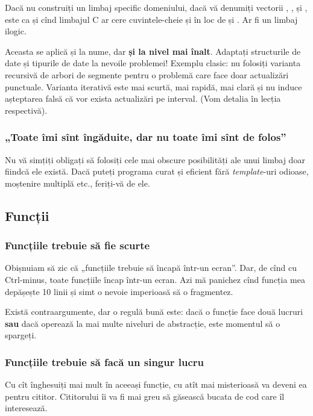 \documentclass[../main.tex]{subfiles}
\begin{document}
Dacă nu construiți un limbaj specific domeniului, dacă vă denumiți vectorii , ,  și , este ca și cînd limbajul C ar cere cuvintele-cheie  și  în loc de  și . Ar fi un limbaj ilogic.

Aceasta se aplică și la nume, dar \textbf{și la nivel mai înalt}. Adaptați structurile de date și tipurile de date la nevoile problemei! Exemplu clasic: nu folosiți varianta recursivă de arbori de segmente pentru o problemă care face doar actualizări punctuale. Varianta iterativă este mai scurtă, mai rapidă, mai clară și nu induce așteptarea falsă că vor exista actualizări pe interval. (Vom detalia în lecția respectivă).

\subsubsection*{„Toate îmi sînt îngăduite, dar nu toate îmi sînt de folos”}

Nu vă simțiți obligați să folosiți cele mai obscure posibilități ale unui limbaj doar fiindcă ele există. Dacă puteți programa curat și eficient fără \textit{template}-uri odioase, moștenire multiplă etc., feriți-vă de ele.

\subsection{Funcții}

\subsubsection*{Funcțiile trebuie să fie scurte}

Obișnuiam să zic că „funcțiile trebuie să încapă într-un ecran”. Dar, de cînd cu Ctrl-minus, toate funcțiile încap într-un ecran. Azi mă panichez cînd funcția mea depășește 10 linii și simt o nevoie imperioasă să o fragmentez.

Există contraargumente, dar o regulă bună este: dacă o funcție face două lucruri \textbf{sau} dacă operează la mai multe niveluri de abstracție, este momentul să o spargeți.

\subsubsection*{Funcțiile trebuie să facă un singur lucru}

Cu cît înghesuiți mai mult în aceeași funcție, cu atît mai misterioasă va deveni ea pentru cititor. Cititorului îi va fi mai greu să găsească bucata de cod care îl interesează.
\end{document}
